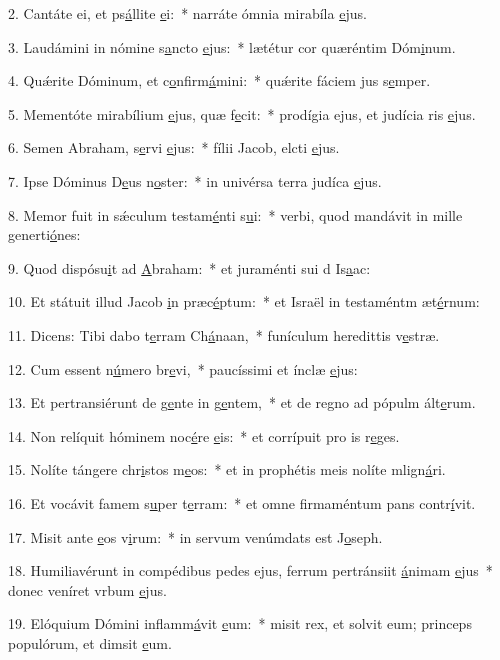 2. Cantáte ei, et ps\uline{á}llite \uline{e}i:~* narráte ómnia mirabíla \uline{e}jus.\par 
3. Laudámini in nómine s\uline{a}ncto \uline{e}jus:~* lætétur cor quæréntim Dóm\uline{i}num.\par 
4. Quǽrite Dóminum, et c\uline{o}nfirm\uline{á}mini:~* quǽrite fáciem jus s\uline{e}mper.\par 
5. Mementóte mirabílium \uline{e}jus, quæ f\uline{e}cit:~* prodígia ejus, et judícia ris \uline{e}jus.\par 
6. Semen Abraham, s\uline{e}rvi \uline{e}jus:~* fílii Jacob, elcti \uline{e}jus.\par 
7. Ipse Dóminus D\uline{e}us n\uline{o}ster:~* in univérsa terra judíca \uline{e}jus.\par 
8. Memor fuit in sǽculum testam\uline{é}nti s\uline{u}i:~* verbi, quod mandávit in mille generti\uline{ó}nes:\par 
9. Quod dispósu\uline{i}t ad \uline{A}braham:~* et juraménti sui d Is\uline{a}ac:\par 
10. Et státuit illud Jacob \uline{i}n præc\uline{é}ptum:~* et Israël in testaméntm æt\uline{é}rnum:\par 
11. Dicens: Tibi dabo t\uline{e}rram Ch\uline{á}naan,~* funículum heredittis v\uline{e}stræ.\par 
12. Cum essent n\uline{ú}mero br\uline{e}vi,~* paucíssimi et ínclæ \uline{e}jus:\par 
13. Et pertransiérunt de g\uline{e}nte in g\uline{e}ntem,~* et de regno ad pópulm ált\uline{e}rum.\par 
14. Non relíquit hóminem noc\uline{é}re \uline{e}is:~* et corrípuit pro is r\uline{e}ges.\par 
15. Nolíte tángere chr\uline{i}stos m\uline{e}os:~* et in prophétis meis nolíte mlign\uline{á}ri.\par 
16. Et vocávit famem s\uline{u}per t\uline{e}rram:~* et omne firmaméntum pans contr\uline{í}vit.\par 
17. Misit ante \uline{e}os v\uline{i}rum:~* in servum venúmdats est J\uline{o}seph.\par 
18. Humiliavérunt in compédibus pedes ejus, ferrum pertránsiit \uline{á}nimam \uline{e}jus~* donec veníret vrbum \uline{e}jus.\par 
19. Elóquium Dómini inflamm\uline{á}vit \uline{e}um:~* misit rex, et solvit eum; princeps populórum, et dimsit \uline{e}um.\par 
